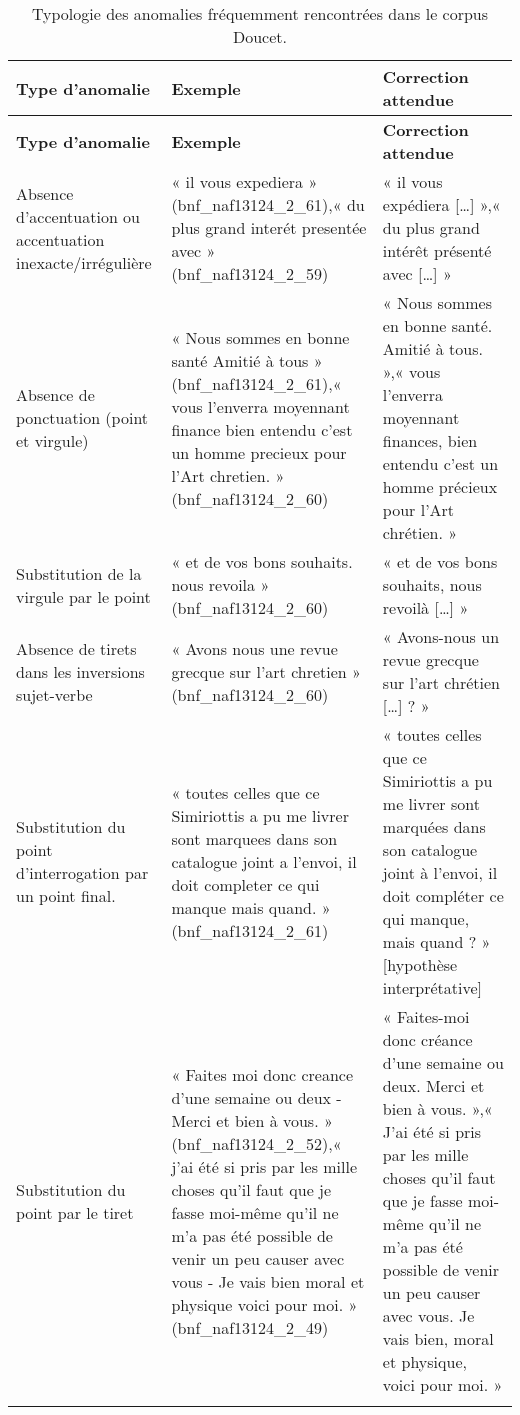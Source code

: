 \begin{center}     
\begin{longtable}{|p{5cm}|p{5cm}|p{5cm}|}
    \hline
    \textbf{Type d'anomalie} & \textbf{Exemple} & \textbf{Correction attendue}\endfirsthead \\ \hline
    \textbf{Type d'anomalie} & \textbf{Exemple} & \textbf{Correction attendue}\endhead \\ \hline
    
    Absence d’accentuation ou accentuation inexacte/irrégulière & « il vous expediera » (bnf\_naf13124\_2\_61),\newline « du plus grand interét presentée avec » (bnf\_naf13124\_2\_59) & « il vous expédiera […] »,\newline « du plus grand intérêt présenté avec […] » \\ \hline
    Absence de ponctuation (point et virgule) & « Nous sommes en bonne santé Amitié à tous » (bnf\_naf13124\_2\_61),\newline « vous l'enverra moyennant finance bien entendu c'est un homme precieux pour l'Art chretien. » (bnf\_naf13124\_2\_60) & « Nous sommes en bonne santé. Amitié à tous. »,\newline « vous l’enverra moyennant finances, bien entendu c’est un homme précieux pour l’Art chrétien. » \\ \hline
    Substitution de la virgule par le point & « et de vos bons souhaits. nous revoila » (bnf\_naf13124\_2\_60) & « et de vos bons souhaits, nous revoilà […] » \\ \hline    
    Absence de tirets dans les inversions sujet-verbe & « Avons nous une revue grecque sur l'art chretien » (bnf\_naf13124\_2\_60) & « Avons-nous un revue grecque sur l’art chrétien […] ? » \\ \hline   
    Substitution du point d’interrogation par un point final. & « toutes celles que ce
Simiriottis a pu me livrer sont marquees dans son catalogue joint a l'envoi, il doit completer ce qui manque mais quand. » (bnf\_naf13124\_2\_61) & « toutes celles que ce Simiriottis a pu me livrer sont marquées dans son catalogue joint à l’envoi, il doit compléter ce qui manque, mais quand ? » [hypothèse interprétative] \\ \hline    
    Substitution du point par le tiret & « Faites moi donc creance d'une semaine ou deux - Merci et bien à vous. » (bnf\_naf13124\_2\_52),\newline « j'ai été si pris par les mille choses qu'il faut que je fasse moi-même qu'il ne m'a pas été possible de venir un peu causer avec vous - Je vais bien moral et physique voici pour moi. » (bnf\_naf13124\_2\_49) & « Faites-moi donc créance d’une semaine ou deux. Merci et bien à vous. »,\newline « J’ai été si pris par les mille choses qu’il faut que je fasse moi-même qu’il ne m’a pas été possible de venir un peu causer avec vous. Je vais bien, moral et physique, voici pour moi. » \\ \hline 
    \caption{Typologie des anomalies fréquemment rencontrées dans le corpus Doucet.} %
\end{longtable}   
\end{center}

